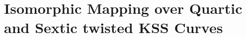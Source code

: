 \documentclass[
12pt, %
english, %
singlespacing, %
liststotoc, %
toctotoc, %
parskip, %
headsepline, %
consistentlayout, %
]{MastersDoctoralThesis} %
\begin{document}
\mainmatter %

\pagestyle{thesis} %
%
% 
% 


% 

% 



% 
\chapter{Isomorphic Mapping over Quartic and Sextic twisted KSS Curves}


%

%
%
% 
% 
% 
\end{document}
